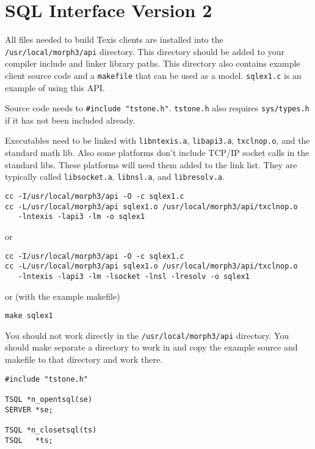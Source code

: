 
\newpage\section{SQL Interface Version 2}


\DESCRIPTION

All files needed to build Texis clients are installed into the
\verb`/usr/local/morph3/api` directory.  This directory should be added
to your compiler include and linker library paths.  This directory also
contains example client source code and a \verb`makefile` that can be
used as a model. \verb`sqlex1.c` is an example of using this API.

Source code needs to \verb`#include "tstone.h"`.  \verb`tstone.h` also
requires \verb`sys/types.h` if it has not been included already.

Executables need to be linked with \verb`libntexis.a`, \verb`libapi3.a`,
\verb`txclnop.o`, and the standard math lib.  Also some platforms don't
include TCP/IP socket calls in the standard libs.  These platforms will
need them added to the link list.  They are typically called
\verb`libsocket.a`, \verb`libnsl.a`, and \verb`libresolv.a`.

\begin{verbatim}
cc -I/usr/local/morph3/api -O -c sqlex1.c
cc -L/usr/local/morph3/api sqlex1.o /usr/local/morph3/api/txclnop.o
   -lntexis -lapi3 -lm -o sqlex1
\end{verbatim}

or

\begin{verbatim}
cc -I/usr/local/morph3/api -O -c sqlex1.c
cc -L/usr/local/morph3/api sqlex1.o /usr/local/morph3/api/txclnop.o
   -lntexis -lapi3 -lm -lsocket -lnsl -lresolv -o sqlex1
\end{verbatim}

or (with the example makefile)

\begin{verbatim}
make sqlex1
\end{verbatim}

You should not work directly in the \verb`/usr/local/morph3/api`
directory.  You should make separate a directory to work in and copy the
example source and makefile to that directory and work there.

\SYNOPSIS
\begin{verbatim}
#include "tstone.h"

TSQL *n_opentsql(se)
SERVER *se;

TSQL *n_closetsql(ts)
TSQL   *ts;
\end{verbatim}

